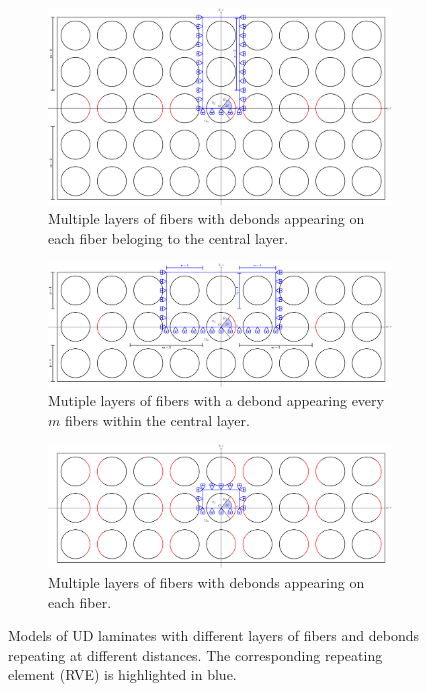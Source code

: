 \documentclass[review]{elsarticle}
\begin{document}
\begin{figure}[!h]
\centering
    \begin{subfigure}[b]{\textwidth}
    \centering
        \includegraphics[height=0.3\textheight]{thickPlycentraldebondsline.pdf}
        \caption{Multiple layers of fibers with debonds appearing on each fiber beloging to the central layer.}\label{subfig:thickplycentraldebonds}
    \end{subfigure} 

    \begin{subfigure}[b]{\textwidth}
        \includegraphics[width=\textwidth]{thickPly.pdf}
        \caption{Mutiple layers of fibers with a debond appearing every $m$ fibers within the central layer.}\label{subfig:thickply}
    \end{subfigure} 

    \begin{subfigure}[b]{\textwidth}
        \includegraphics[width=\textwidth]{thickPlyAllDebonds.pdf}
        \caption{Multiple layers of fibers with debonds appearing on each fiber.}\label{subfig:thickplyalldebonds}
    \end{subfigure} 

\caption{Models of UD laminates with different layers of fibers and debonds repeating at different distances. The corresponding repeating element (RVE) is highlighted in blue.}\label{fig:laminateModelsB}
\end{figure}
\end{document}
